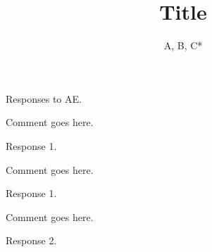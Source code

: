 \documentclass[10pt,framed]{sjrp}
\begin{document}
\title{Title}
\author{A, B, C*}
\makelion

\RAE
Responses to AE.

\begin{com}
  Comment goes here.
\end{com}

\response
Response 1.


\clearpage
{}
\begin{com}
  Comment goes here.
\end{com}

\response
Response 1.

\vskip 3pc
\begin{com}
  Comment goes here.
\end{com}
\response

Response 2.


\end{document}
